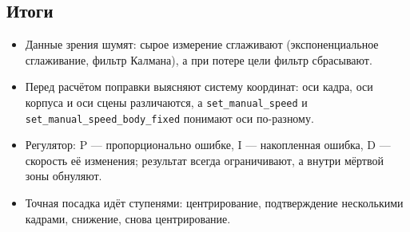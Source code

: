\subsection*{Итоги}
\begin{itemize}
    \item Данные зрения шумят: сырое измерение сглаживают (экспоненциальное сглаживание, фильтр Калмана), а при потере цели фильтр сбрасывают.
    \item Перед расчётом поправки выясняют систему координат: оси кадра, оси корпуса и оси сцены различаются, а \texttt{set\_manual\_speed} и \texttt{set\_manual\_speed\_body\_fixed} понимают оси по-разному.
    \item Регулятор: P --- пропорционально ошибке, I --- накопленная ошибка, D --- скорость её изменения; результат всегда ограничивают, а внутри мёртвой зоны обнуляют.
    \item Точная посадка идёт ступенями: центрирование, подтверждение несколькими кадрами, снижение, снова центрирование.
\end{itemize}
